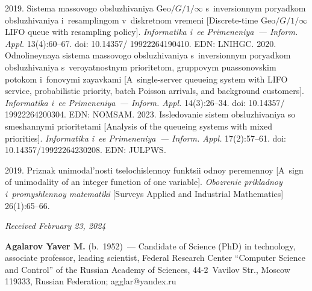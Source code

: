 \begin{multicols}{2}
{{\begin{thebibliography}{99}
 2019. Sistema massovogo obsluzhivaniya 
$\mathrm{Geo}/G/1/\infty$ s~inversionnym poryadkom obsluzhivaniya i~resamplingom v~diskretnom vremeni 
[Discrete-time $\mathrm{Geo}/G/1/\infty$ LIFO queue with resampling policy]. \textit{Informatika i~ee Primeneniya~--- Inform. 
Appl.} 13(4):60--67. doi: 10.14357/ 19922264190410. EDN: LNIHGC.
 2020. Od\-no\-li\-ney\-naya sistema massovogo obsluzhivaniya 
s~in\-ver\-si\-on\-nym poryadkom obsluzhivaniya s~veroyatnostnym prioritetom, gruppovym puassonovskim 
\mbox{potokom} i~fonovymi zayavkami [A~single-server queueing system with \mbox{LIFO} service, probabilistic priority, 
batch Poisson arrivals, and background customers]. \textit{Informatika i~ee Primeneniya~--- Inform. Appl.} 
14(3):26--34. doi: 10.14357/ 19922264200304. EDN: NOMSAM.
 2023. Issledovanie sistem obsluzhivaniya so smeshannymi 
prioritetami [Analysis of the queueing systems with mixed priorities]. \textit{Informatika i~ee Primeneniya~--- 
Inform. Appl.} 17(2):57--61. doi: 10.14357/19922264230208. EDN: \mbox{JULPWS}.
{

}
 2019. Priznak unimodal'nosti tselochislennoy funktsii odnoy peremennoy [A~sign of 
unimodality of an integer function of one variable]. \textit{Obozrenie prikladnoy i~promyshlennoy matematiki} 
[Surveys Applied and Industrial Mathematics] 26(1):65--66.

\end{thebibliography}

 }
 }

\end{multicols}

\vspace*{-6pt}

\hfill{\small\textit{Received February 23, 2024}} 

\vspace*{-18pt}


\Contrl

\vspace*{-3pt}

\noindent
\textbf{Agalarov Yaver M.} (b.\ 1952)~--- Candidate of Science (PhD) in technology, associate professor, 
leading scientist, Federal Research Center ``Computer Science and Control'' of the Russian Academy of 
Sciences, 44-2~Vavilov Str., Moscow 119333, Russian Federation; \mbox{agglar@yandex.ru}




\label{end\stat}

\renewcommand{\bibname}{\protect\rm Литература} 